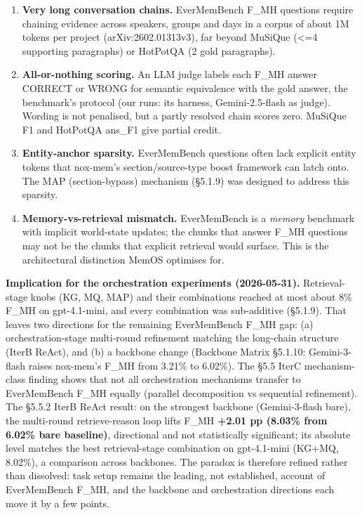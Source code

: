 \documentclass[
]{article}
\providecommand{\tightlist}{%
  \setlength{\itemsep}{0pt}\setlength{\parskip}{0pt}}
\begin{document}
\begin{enumerate}
\def\labelenumi{\arabic{enumi}.}
\tightlist
\item
  \textbf{Very long conversation chains.} EverMemBench F\_MH questions
  require chaining evidence across speakers, groups and days in a corpus
  of about 1M tokens per project (arXiv:2602.01313v3), far beyond
  MuSiQue (\textless=4 supporting paragraphs) or HotPotQA (2 gold
  paragraphs).
\item
  \textbf{All-or-nothing scoring.} An LLM judge labels each F\_MH answer
  CORRECT or WRONG for semantic equivalence with the gold answer, the
  benchmark's protocol (our runs: its harness, Gemini-2.5-flash as
  judge). Wording is not penalised, but a partly resolved chain scores
  zero. MuSiQue F1 and HotPotQA ans\_F1 give partial credit.
\item
  \textbf{Entity-anchor sparsity.} EverMemBench questions often lack
  explicit entity tokens that nox-mem's section/source-type boost
  framework can latch onto. The MAP (section-bypass) mechanism (§5.1.9)
  was designed to address this sparsity.
\item
  \textbf{Memory-vs-retrieval mismatch.} EverMemBench is a \emph{memory}
  benchmark with implicit world-state updates; the chunks that answer
  F\_MH questions may not be the chunks that explicit retrieval would
  surface. This is the architectural distinction MemOS optimises for.
\end{enumerate}

\textbf{Implication for the orchestration experiments (2026-05-31).}
Retrieval-stage knobs (KG, MQ, MAP) and their combinations reached at
most about 8\% F\_MH on gpt-4.1-mini, and every combination was
sub-additive (§5.1.9). That leaves two directions for the remaining
EverMemBench F\_MH gap: (a) orchestration-stage multi-round refinement
matching the long-chain structure (IterB ReAct), and (b) a backbone
change (Backbone Matrix §5.1.10: Gemini-3-flash raises nox-mem's F\_MH
from 3.21\% to 6.02\%). The §5.5 IterC mechanism-class finding shows
that not all orchestration mechanisms transfer to EverMemBench F\_MH
equally (parallel decomposition vs sequential refinement). The §5.5.2
IterB ReAct result: on the strongest backbone (Gemini-3-flash bare), the
multi-round retrieve-reason loop lifts F\_MH \textbf{+2.01 pp (8.03\%
from 6.02\% bare baseline)}, directional and not statistically
significant; its absolute level matches the best retrieval-stage
combination on gpt-4.1-mini (KG+MQ, 8.02\%), a comparison across
backbones. The paradox is therefore refined rather than dissolved: task
setup remains the leading, not established, account of EverMemBench
F\_MH, and the backbone and orchestration directions each move it by a
few points.
\end{document}
